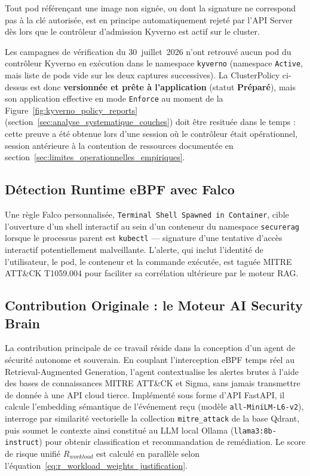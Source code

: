 Tout pod référençant une image non signée, ou dont la signature ne correspond pas à la clé autorisée, est en principe automatiquement rejeté par l'API Server dès lors que le contrôleur d'admission Kyverno est actif sur le cluster.

\begin{tcolorbox}[colback=LightGray!30, colframe=orange!70!black, arc=3pt,
    title={\small\bfseries Précision temporelle ajoutée sur l'état de Kyverno}]
\footnotesize
Les campagnes de vérification du 30~juillet~2026 n'ont retrouvé aucun pod du contrôleur Kyverno en exécution dans le namespace \texttt{kyverno} (namespace \texttt{Active}, mais liste de pods vide sur les deux captures successives). La ClusterPolicy ci-dessus est donc \textbf{versionnée et prête à l'application} (statut \textbf{Préparé}), mais son application effective en mode \texttt{Enforce} au moment de la Figure~\ref{fig:kyverno_policy_reports} (section~\ref{sec:analyse_systematique_couches}) doit être resituée dans le temps : cette preuve a été obtenue lors d'une session où le contrôleur était opérationnel, session antérieure à la contention de ressources documentée en section~\ref{sec:limites_operationnelles_empiriques}.
\end{tcolorbox}

\subsection{Détection Runtime eBPF avec Falco}

Une règle Falco personnalisée, \texttt{Terminal Shell Spawned in Container}, cible l'ouverture d'un shell interactif au sein d'un conteneur du namespace \texttt{securerag} lorsque le processus parent est \texttt{kubectl} — signature d'une tentative d'accès interactif potentiellement malveillante. L'alerte, qui inclut l'identité de l'utilisateur, le pod, le conteneur et la commande exécutée, est taguée MITRE ATT\&CK T1059.004 pour faciliter sa corrélation ultérieure par le moteur RAG.

\subsection{Contribution Originale : le Moteur AI Security Brain}

La contribution principale de ce travail réside dans la conception d'un agent de sécurité autonome et souverain. En couplant l'interception eBPF temps réel au Retrieval-Augmented Generation, l'agent contextualise les alertes brutes à l'aide des bases de connaissances MITRE ATT\&CK et Sigma, sans jamais transmettre de donnée à une API cloud tierce. Implémenté sous forme d'API FastAPI, il calcule l'embedding sémantique de l'événement reçu (modèle \texttt{all-MiniLM-L6-v2}), interroge par similarité vectorielle la collection \texttt{mitre\_attack} de la base Qdrant, puis soumet le contexte ainsi constitué au LLM local Ollama (\texttt{llama3:8b-instruct}) pour obtenir classification et recommandation de remédiation. Le score de risque unifié $R_{workload}$ est calculé en parallèle selon l'équation~\ref{eq:r_workload_weights_justification}.

